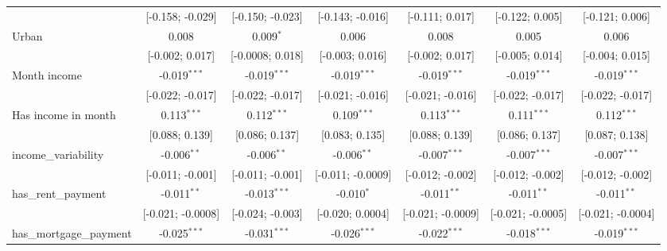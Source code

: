 \begin{table}[htbp]
\begin{threeparttable}[b]
\begin{tabular}{lcccccc}
                                   & [-0.158; -0.029]                & [-0.150; -0.023] & [-0.143; -0.016]  & [-0.111; 0.017]                 & [-0.122; 0.005]   & [-0.121; 0.006]\\   
         Urban                     & 0.008                           & 0.009$^{*}$      & 0.006             & 0.008                           & 0.005             & 0.006\\   
                                   & [-0.002; 0.017]                 & [-0.0008; 0.018] & [-0.003; 0.016]   & [-0.002; 0.017]                 & [-0.005; 0.014]   & [-0.004; 0.015]\\   
         Month income              & -0.019$^{***}$                  & -0.019$^{***}$   & -0.019$^{***}$    & -0.019$^{***}$                  & -0.019$^{***}$    & -0.019$^{***}$\\   
                                   & [-0.022; -0.017]                & [-0.022; -0.017] & [-0.021; -0.016]  & [-0.021; -0.016]                & [-0.022; -0.017]  & [-0.022; -0.017]\\   
         Has income in month       & 0.113$^{***}$                   & 0.112$^{***}$    & 0.109$^{***}$     & 0.113$^{***}$                   & 0.111$^{***}$     & 0.112$^{***}$\\   
                                   & [0.088; 0.139]                  & [0.086; 0.137]   & [0.083; 0.135]    & [0.088; 0.139]                  & [0.086; 0.137]    & [0.087; 0.138]\\   
         income\_variability       & -0.006$^{**}$                   & -0.006$^{**}$    & -0.006$^{**}$     & -0.007$^{***}$                  & -0.007$^{***}$    & -0.007$^{***}$\\   
                                   & [-0.011; -0.001]                & [-0.011; -0.001] & [-0.011; -0.0009] & [-0.012; -0.002]                & [-0.012; -0.002]  & [-0.012; -0.002]\\   
         has\_rent\_payment        & -0.011$^{**}$                   & -0.013$^{***}$   & -0.010$^{*}$      & -0.011$^{**}$                   & -0.011$^{**}$     & -0.011$^{**}$\\   
                                   & [-0.021; -0.0008]               & [-0.024; -0.003] & [-0.020; 0.0004]  & [-0.021; -0.0009]               & [-0.021; -0.0005] & [-0.021; -0.0004]\\   
         has\_mortgage\_payment    & -0.025$^{***}$                  & -0.031$^{***}$   & -0.026$^{***}$    & -0.022$^{***}$                  & -0.018$^{***}$    & -0.019$^{***}$\\   

\end{tabular}
\end{threeparttable}
\end{table}
